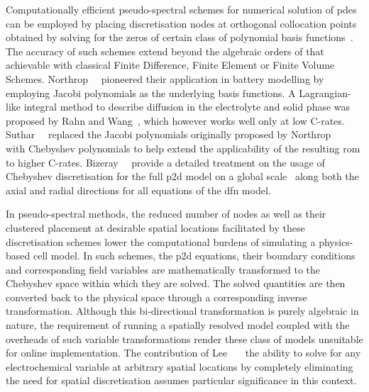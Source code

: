Computationally    efficient     pseudo-spectral    schemes     for    numerical
solution   of   \glspl{pde}   can   be  employed   by   placing   discretisation
nodes    at    orthogonal    collocation     points    obtained    by    solving
for     the     zeros    of     certain     class     of    polynomial     basis
functions~\cite{Ferguson1971,Trefethen2000,Boyd2001,Shizgal2015,Dutykh2016}. The
accuracy of such  schemes extend beyond the algebraic orders  of that achievable
with  classical Finite  Difference,  Finite Element  or  Finite Volume  Schemes.
Northrop~\etal{}~\cite{Northrop2011}  pioneered  their  application  in  battery
modelling  by  employing  Jacobi  polynomials  as  the underlying  basis
functions.  A  Lagrangian-like integral  method to  describe  diffusion in the
electrolyte  and  solid phase  was  proposed by  Rahn and Wang~\cite{Rahn2013},
which however works well only at low C-rates. Suthar~\etal{}~\cite{Suthar2014}
replaced  the Jacobi  polynomials  originally proposed by
Northrop~\etal~\cite{Northrop2011} with  Chebyshev polynomials to  help extend
the  applicability of the  resulting \gls{rom}  to higher C-rates.
Bizeray~\etal{}~\cite{Bizeray2015} provide a  detailed treatment on the usage of
Chebyshev  discretisation for  the full  \gls{p2d} model  on a  global scale
\ie~along both the axial and radial directions for all equations of the
\gls{dfn}  model.

In  pseudo-spectral  methods, the  reduced  number   of  nodes  as  well  as
their   clustered  placement  at desirable  spatial  locations  facilitated by
these  discretisation  schemes lower  the computational  burdens  of simulating
a  physics-based cell  model. In such schemes, the  \gls{p2d} equations,  their
boundary conditions  and corresponding  field variables  are mathematically
transformed to the Chebyshev space within which they are solved. The solved
quantities are then converted back to the physical  space through  a
corresponding  inverse transformation. Although this bi-directional
transformation is  purely algebraic  in nature, the requirement of  running a
spatially  resolved  model coupled  with  the overheads of  such variable
transformations render  these class  of models unsuitable for  online
implementation.  The contribution  of Lee~\etal~\cite{Lee2012a,Lee2012}  \ie~the
ability to solve for any electrochemical variable at arbitrary spatial locations
by completely eliminating the need for spatial discretisation assumes particular
significance in this context.



